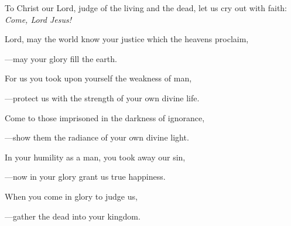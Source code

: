 \intercessions\indent

\begin{hangpar}

To Christ our Lord, judge of the living and the dead, let us cry out with faith:\\
\emph{Come, Lord Jesus!}

\medskip Lord, may the world know your justice which the heavens proclaim,

{\color{red}---\thinspace}may your glory fill the earth.

\medskip For us you took upon yourself the weakness of man,

{\color{red}---\thinspace}protect us with the strength of your own divine life.

\medskip Come to those imprisoned in the darkness of ignorance,

{\color{red}---\thinspace}show them the radiance of your own divine light.

\medskip In your humility as a man, you took away our sin,

{\color{red}---\thinspace}now in your glory grant us true happiness.

\medskip When you come in glory to judge us,

{\color{red}---\thinspace}gather the dead into your kingdom.

\medskip

\end{hangpar}
